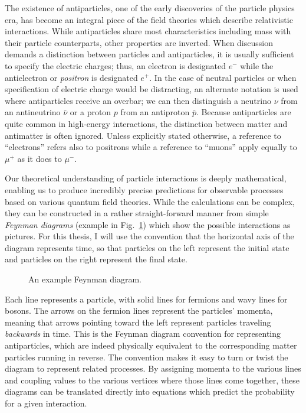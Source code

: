 The existence of antiparticles, one of the early discoveries of the particle physics era, has become an integral piece of the field theories which describe relativistic interactions.  While antiparticles share most characteristics including mass with their particle counterparts, other properties are inverted.  When discussion demands a distinction between particles and antiparticles, it is usually sufficient to specify the electric charges; thus, an electron is designated $e^-$ while the antielectron or \emph{positron} is designated $e^+$.  In the case of neutral particles or when specification of electric charge would be distracting, an alternate notation is used where antiparticles receive an overbar; we can then distinguish a neutrino $\nu$ from an antineutrino $\bar{\nu}$ or a proton $p$ from an antiproton $\bar{p}$.  Because antiparticles are quite common in high-energy interactions, the distinction between matter and antimatter is often ignored.  Unless explicitly stated otherwise, a reference to ``electrons'' refers also to positrons while a reference to ``muons'' apply equally to $\mu^+$ as it does to $\mu^-$.

Our theoretical understanding of particle interactions is deeply mathematical, enabling us to produce incredibly precise predictions for observable processes based on various quantum field theories.  While the calculations can be complex, they can be constructed in a rather straight-forward manner from simple \emph{Feynman diagrams} (example in Fig.~\ref{fig:example-feynman}) which show the possible interactions as pictures.  For this thesis, I will use the convention that the horizontal axis of the diagram represents time, so that particles on the left represent the initial state and particles on the right represent the final state.

\begin{figure}[h]
  \centering
  
  \caption{An example Feynman diagram.}
  \label{fig:example-feynman}
\end{figure}

Each line represents a particle, with solid lines for fermions and wavy lines for bosons.  The arrows on the fermion lines represent the particles' momenta, meaning that arrows pointing toward the left represent particles traveling \emph{backwards} in time.  This is the Feynman diagram convention for representing antiparticles, which are indeed physically equivalent to the corresponding matter particles running in reverse.  The convention makes it easy to turn or twist the diagram to represent related processes.  By assigning momenta to the various lines and coupling values to the various vertices where those lines come together, these diagrams can be translated directly into equations which predict the probability for a given interaction.
